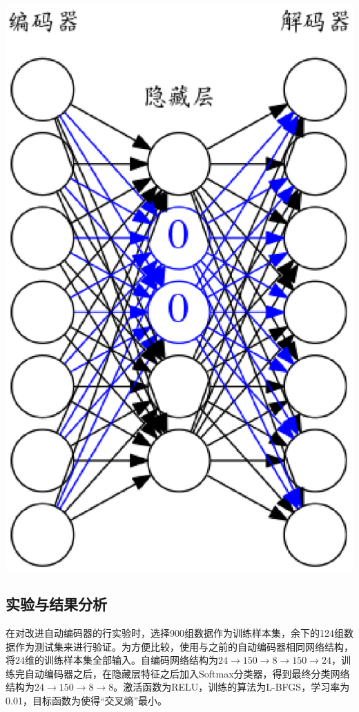 \documentclass{ctacn}%
\begin{document}
\begin{multicols}{2}
\begin{center}
	\includegraphics[scale=0.14, trim=0 0 0 0]{figs/denoised_autoencoder}\\
	\label{fig8}
\end{center}

\subsection{实验与结果分析}

在对改进自动编码器的行实验时，选择900组数据作为训练样本集，余下的124组数据作为测试集来进行验证。为方便比较，使用与之前的自动编码器相同网络结构，将$24$维的训练样本集全部输入。自编码网络结构为$24\rightarrow150\rightarrow8\rightarrow150\rightarrow24$，训练完自动编码器之后，在隐藏层特征之后加入Softmax分类器，得到最终分类网络结构为$24\rightarrow150\rightarrow8\rightarrow8$。激活函数为RELU，训练的算法为L-BFGS，学习率为0.01，目标函数为使得“交叉熵”最小。


\end{multicols}
\end{document}
